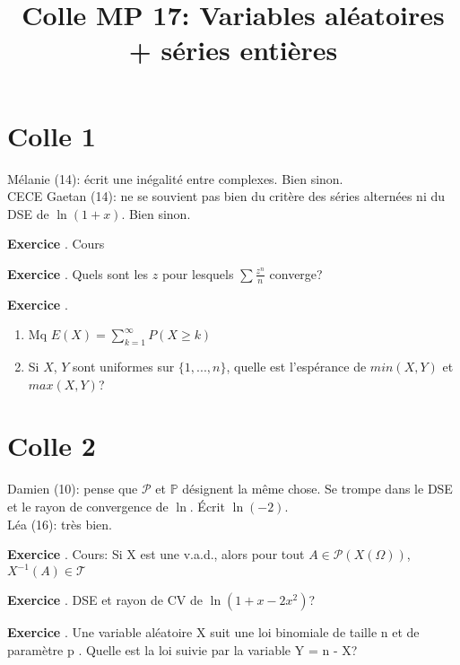 \documentclass[10pt,a4paper]{article}
\title{Colle MP 17: Variables aléatoires + séries entières}
\newcounter{question}
\newcounter{exo}
\newenvironment{exo}{\vspace{0.5cm}\setcounter{question}{0}\addtocounter{exo}{1} \noindent \textbf{Exercice \theexo}. \normalsize }{\par}
\begin{document}
	\maketitle
	
	\section*{Colle 1}
	Mélanie (14): écrit une inégalité entre complexes. Bien sinon.\\
	CECE Gaetan (14): ne se souvient pas bien du critère des séries alternées ni du DSE de $\ln(1+x)$. Bien sinon.

	\begin{exo}
		Cours
	\end{exo}

	\begin{exo}
		Quels sont les $z$ pour lesquels $\sum \frac{z^n}{n}$ converge?
	\end{exo}
	
	\begin{exo}
		\begin{enumerate}
			\item Mq $E(X) = \sum_{k=1}^\infty P(X \geq k)$
			\item Si $X$, $Y$ sont uniformes sur $\lbrace 1,..., n \rbrace$, quelle est l'espérance de $min(X, Y)$ et $max(X, Y)$?
		\end{enumerate}
	\end{exo}	
		
	\section*{Colle 2}
	\setcounter{exo}{0}
	Damien (10): pense que $\mathcal{P}$ et $\mathbb{P}$ désignent la même chose. Se trompe dans le DSE et le rayon de convergence de $\ln$. Écrit $\ln(-2)$.\\
	Léa (16): très bien.
	
	\begin{exo}
		Cours: Si X est une v.a.d., alors pour tout $A \in \mathcal{P}(X(\Omega))$, $X^{-1}(A) \in \mathcal{T}$
	\end{exo}
	\begin{exo}
		DSE et rayon de CV de $\ln(1 + x - 2x^2)$?
	\end{exo}
	
	\begin{exo}
		Une variable aléatoire X suit une loi binomiale de taille n et de paramètre p .
		Quelle est la loi suivie par la variable Y = n - X?
	\end{exo}
\end{document}
